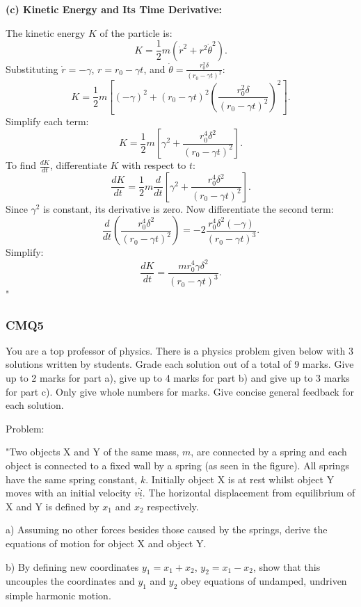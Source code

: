 \textbf{(c) Kinetic Energy and Its Time Derivative:}

The kinetic energy \( K \) of the particle is:
\[
K = \frac{1}{2} m \left( \dot{r}^2 + r^2 \dot{\theta}^2 \right).
\]
Substituting \( \dot{r} = -\gamma \), \( r = r_0 - \gamma t \), and \( \dot{\theta} = \frac{r_0^2 \delta}{(r_0 - \gamma t)^2} \):
\[
K = \frac{1}{2} m \left[ (-\gamma)^2 + (r_0 - \gamma t)^2 \left( \frac{r_0^2 \delta}{(r_0 - \gamma t)^2} \right)^2 \right].
\]
Simplify each term:
\[
K = \frac{1}{2} m \left[ \gamma^2 + \frac{r_0^4 \delta^2}{(r_0 - \gamma t)^2} \right].
\]
To find \( \frac{dK}{dt} \), differentiate \( K \) with respect to \( t \):
\[
\frac{dK}{dt} = \frac{1}{2} m \frac{d}{dt} \left[ \gamma^2 + \frac{r_0^4 \delta^2}{(r_0 - \gamma t)^2} \right].
\]
Since \( \gamma^2 \) is constant, its derivative is zero. Now differentiate the second term:
\[
\frac{d}{dt} \left( \frac{r_0^4 \delta^2}{(r_0 - \gamma t)^2} \right) = -2 \frac{r_0^4 \delta^2 (-\gamma)}{(r_0 - \gamma t)^3}.
\]
Simplify:
\[
\frac{dK}{dt} = \frac{m r_0^4 \gamma \delta^2}{(r_0 - \gamma t)^3}.
\]
"

\subsubsection{CMQ5}

You are a top professor of physics. There is a physics problem given below with 3 solutions written by students. Grade each solution out of a total of 9 marks. Give up to 2 marks for part a), give up to 4 marks for part b) and give up to 3 marks for part c). Only give whole numbers for marks. Give concise general feedback for each solution.

Problem: 

"Two objects X and Y of the same mass, \( m \), are connected by a spring and each object is connected to a fixed wall by a spring (as seen in the figure). All springs have the same spring constant, \( k \). Initially object X is at rest whilst object Y moves with an initial velocity \( v \hat{\underline{i}} \). The horizontal displacement from equilibrium of X and Y is defined by \( x_{1} \) and \( x_{2} \) respectively. 

a) Assuming no other forces besides those caused by the springs, derive the equations of motion for object X and object Y. 
    
b) By defining new coordinates \( y_{1} = x_{1} + x_{2} \), \( y_{2} = x_{1} - x_{2} \), show that this uncouples the coordinates and \( y_{1} \) and \( y_{2} \) obey equations of undamped, undriven simple harmonic motion. 
    
